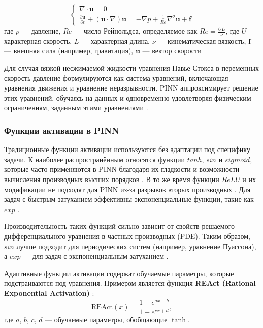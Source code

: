 \begin{equation}
    \begin{cases}
    \nabla \cdot \mathbf{u} = 0 \\
    \frac{\partial \mathbf{u}}{\partial t} + (\mathbf{u} \cdot \nabla) \mathbf{u} = -\nabla p + \frac{1}{Re} \nabla^2 \mathbf{u} + \mathbf{f}
    \end{cases}
    \label{eq:navier_stockes}
\end{equation}
где $p$ — давление, $Re$ — число Рейнольдса, определяемое как $Re = \frac{UL}{\nu}$, где $U$ —
характерная скорость, $L$ — характерная длина, $\nu$ — кинематическая вязкость, $\mathbf{f}$ —
внешняя сила (например, гравитация), $\mathbf{u}$ — вектор скорости

Для случая вязкой несжимаемой жидкости уравнения Навье-Стокса в переменных скорость-давление формулируются
как система уравнений, включающая уравнения движения и уравнение неразрывности. PINN аппроксимирует
решение этих уравнений, обучаясь на данных и одновременно удовлетворяя физическим ограничениям, заданным
этими уравнениями \cite{jin2021nsfnets}.

\subsubsection{Функции активации в PINN}

Традиционные функции активации используются без адаптации под специфику задачи. К наиболее распространённым
относятся функции $tanh$, $sin$ и $sigmoid$, которые часто применяются в PINN благодаря их гладкости
и возможности вычисления производных высших порядков \cite{0d752c79fb816703274a3d37f85a85689a2a9405}
\cite{Sutfeld2018-io}. В то же время функции $ReLU$ и их модификации не подходят для PINN из-за
разрывов вторых производных \cite{fe520ccac2a6bd50f75a4a34022fe54116871013}. Для задач с быстрым затуханием
эффективны экспоненциальные функции, такие как $exp$ \cite{7fcd4b3c875d8e41eb0c184aa1a42bf4c8906d61}.

Производительность таких функций сильно зависит от свойств решаемого дифференциального уравнения в частных
производных (PDE).  Таким образом, $sin$ лучше подходит для периодических систем (например, уравнение
Пуассона), а $exp$ — для задач с экспоненциальным затуханием \cite{fe520ccac2a6bd50f75a4a34022fe54116871013}.

Адаптивные функции активации содержат обучаемые параметры, которые подстраиваются под уравнения. Примером
является функция \textbf{REAct (Rational Exponential Activation)}
\cite{0d752c79fb816703274a3d37f85a85689a2a9405}:
\begin{equation}
\text{REAct}(x) = \frac{1 - e^{ax + b}}{1 + e^{cx + d}},
\end{equation}
где $a$, $b$, $c$, $d$ — обучаемые параметры, обобщающие $\tanh$. 

